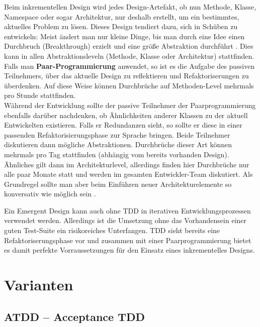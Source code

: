 Beim inkrementellen Design wird jedes Design-Artefakt, ob nun Methode, Klasse, Namespace oder sogar Architektur, nur deshalb erstellt, um ein bestimmtes, aktuelles Problem zu lösen. Dieses Design tendiert dazu, sich in Schüben zu entwickeln: Meist ändert man nur kleine Dinge, bis man durch eine Idee einen Durchbruch (Breakthrough) erzielt und eine größe Abstraktion durchführt \cite{shore_art_2007,evans_domain_driven_2003}. Dies kann in allen Abstraktionsleveln (Methode, Klasse oder Architektur) stattfinden.\\
Falls man \textbf{Paar-Programmierung} anwendet, so ist es die Aufgabe des passiven Teilnehmers, über das aktuelle Design zu reflektieren und Refaktoriserungen zu überdenken. Auf diese Weise können Durchbrüche auf Methoden-Level mehrmals pro Stunde stattfinden.\\
Während der Entwicklung sollte der passive Teilnehmer der Paarprogrammierung ebenfalls darüber nachdenken, ob Ähnlichkeiten anderer Klassen zu der aktuell Entwickelten existieren. Falls er Redundanzen sieht, so sollte er diese in einer passenden Refaktorisierungsphase zur Sprache bringen. Beide Teilnehmer diskutieren dann mögliche Abstraktionen. Durchbrüche dieser Art können mehrmals pro Tag stattfinden (abhängig vom bereits vorhanden Design).\\
Ähnliches gilt dann im Architekturlevel, allerdings finden hier Durchbrüche nur alle paar Monate statt und werden im gesamten Entwickler-Team diskutiert. Als Grundregel sollte man aber beim Einführen neuer Architekturelemente so konversativ wie möglich sein \citep{shore_art_2007}.

Ein Emergent Design kann auch ohne TDD in iterativen Entwicklungsprozessen verwendet werden. Allerdings ist die Umsetzung ohne das Vorhandensein einer guten Test-Suite ein risikoreiches Unterfangen. TDD sieht bereits eine Refaktoriserungsphase vor und zusammen mit einer Paarprogrammierung bietet es damit perfekte Vorraussetzungen für den Einsatz eines inkrementelles Designs.

\section{Varianten}
\subsection{ATDD -- Acceptance TDD}
\label{sec:attd}

